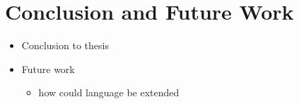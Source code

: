 \chapter{Conclusion and Future Work}
\begin{itemize}
    \item Conclusion to thesis
    \item Future work
    \begin{itemize}
        \item how could language be extended
    \end{itemize}
\end{itemize}